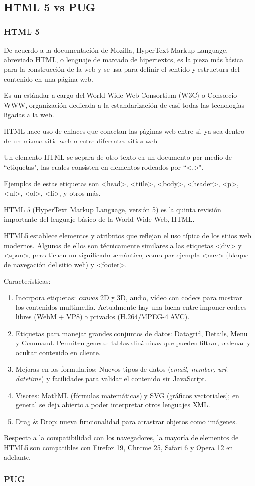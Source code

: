 \subsection{HTML 5 vs PUG}
\subsubsection*{HTML 5}
De acuerdo a la documentación de Mozilla\cite{noauthor_html_nodate}, HyperText Markup Language, abreviado HTML, o lenguaje de marcado de hipertextos, es la pieza más básica para la construcción de la web y se usa para definir el sentido y estructura del contenido en una página web. 


Es un estándar a cargo del World Wide Web Consortium (W3C) o Consorcio WWW, organización dedicada a la estandarización de casi todas las tecnologías ligadas a la web. 


HTML hace uso de enlaces que conectan las páginas web entre sí, ya sea dentro de un mismo sitio web o entre diferentes sitios web.


Un elemento HTML se separa de otro texto en un documento por medio de ``etiquetas", las cuales consisten en elementos rodeados por ``<,>".


Ejemplos de estas etiquetas son <head>, <title>, <body>, <header>, <p>, <ul>, <ol>, <li>, y otros más.


HTML 5 (HyperText Markup Language, versión 5) es la quinta revisión importante del lenguaje básico de la World Wide Web, HTML.


HTML5 establece elementos y atributos que reflejan el uso típico de los sitios web modernos. Algunos de ellos son técnicamente similares a las etiquetas <div> y <span>, pero tienen un significado semántico, como por ejemplo <nav> (bloque de navegación del sitio web) y <footer>.


Características:

\begin{enumerate}
    \item Incorpora etiquetas: \textit{canvas} 2D y 3D, audio, vídeo con codecs para mostrar los contenidos multimedia. Actualmente hay una lucha entre imponer codecs libres (WebM + VP8) o privados (H.264/MPEG-4 AVC).
    \item Etiquetas para manejar grandes conjuntos de datos: Datagrid, Details, Menu y Command. Permiten generar tablas dinámicas que pueden filtrar, ordenar y ocultar contenido en cliente.
    \item Mejoras en los formularios: Nuevos tipos de datos (\textit{email, number, url, datetime})  y facilidades para validar el contenido sin JavaScript.
    \item Visores: MathML (fórmulas matemáticas) y SVG (gráficos vectoriales); en general se deja abierto a poder interpretar otros lenguajes XML.
    \item Drag \& Drop: nueva funcionalidad para arrastrar objetos como imágenes.
\end{enumerate}

Respecto a la compatibilidad con los navegadores, la mayoría de elementos de HTML5 son compatibles con Firefox 19, Chrome 25, Safari 6 y Opera 12 en adelante.

\subsubsection*{PUG}